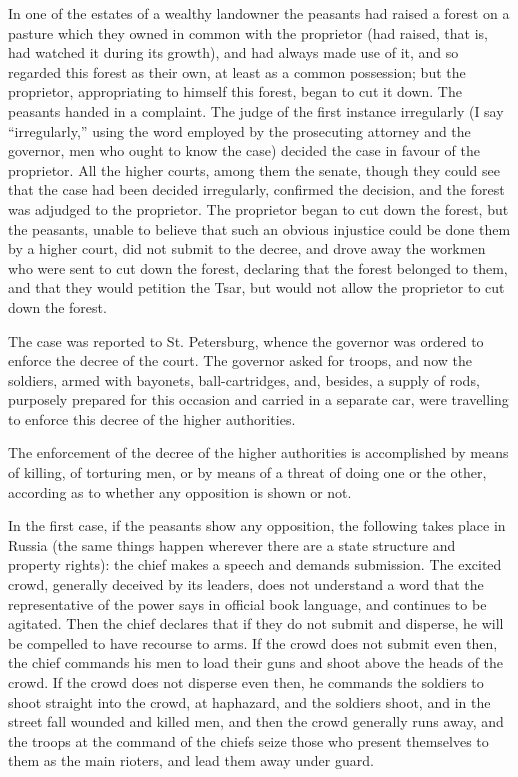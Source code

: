 \documentclass{book}
\begin{document}
In one of the estates of a wealthy landowner the peasants had raised a forest on a pasture which they owned in common with the proprietor (had raised, that is, had watched it during its growth), and had always made use of it, and so regarded this forest as their own, at least as a common possession; but the proprietor, appropriating to himself this forest, began to cut it down. The peasants handed in a complaint. The judge of the first instance irregularly (I say “irregularly,” using the word employed by the prosecuting attorney and the governor, men who ought to know the case) decided the case in favour of the proprietor. All the higher courts, among them the senate, though they could see that the case had been decided irregularly, confirmed the decision, and the forest was adjudged to the proprietor. The proprietor began to cut down the forest, but the peasants, unable to believe that such an obvious injustice could be done them by a higher court, did not submit to the decree, and drove away the workmen who were sent to cut down the forest, declaring that the forest belonged to them, and that they would petition the Tsar, but would not allow the proprietor to cut down the forest.

The case was reported to St. Petersburg, whence the governor was ordered to enforce the decree of the court. The governor asked for troops, and now the soldiers, armed with bayonets, ball-cartridges, and, besides, a supply of rods, purposely prepared for this occasion and carried in a separate car, were travelling to enforce this decree of the higher authorities.

The enforcement of the decree of the higher authorities is accomplished by means of killing, of torturing men, or by means of a threat of doing one or the other, according as to whether any opposition is shown or not.

In the first case, if the peasants show any opposition, the following takes place in Russia (the same things happen wherever there are a state structure and property rights): the chief makes a speech and demands submission. The excited crowd, generally deceived by its leaders, does not understand a word that the representative of the power says in official book language, and continues to be agitated. Then the chief declares that if they do not submit and disperse, he will be compelled to have recourse to arms. If the crowd does not submit even then, the chief commands his men to load their guns and shoot above the heads of the crowd. If the crowd does not disperse even then, he commands the soldiers to shoot straight into the crowd, at haphazard, and the soldiers shoot, and in the street fall wounded and killed men, and then the crowd generally runs away, and the troops at the command of the chiefs seize those who present themselves to them as the main rioters, and lead them away under guard.
\end{document}
